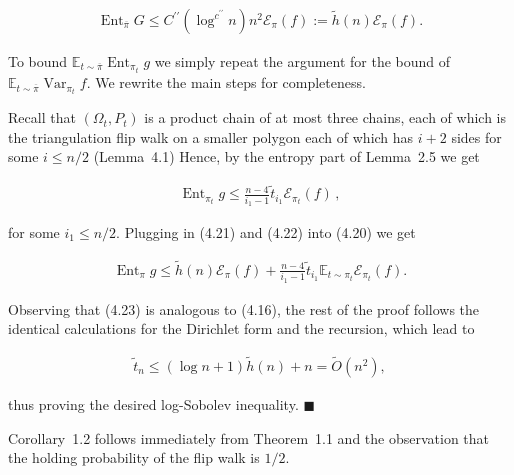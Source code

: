 \documentclass[10pt,a4paper]{article}
\begin{document}
\[\begin{gathered}
\operatorname{Ent}_{\overline{\pi}}G\leq C^{\prime\prime}(\log^{c^{\prime\prime}}n)n^{2}\mathcal{E}_{\pi}(f):=\tilde{h}(n)\mathcal{E}_{\pi}(f).
\end{gathered}\]


To bound $\mathbb{E}_{t\sim\overline{\pi}}\operatorname{Ent}_{\pi_{t}}g$ we simply repeat the argument for the bound of $\mathbb{E}_{t\sim\overline{\pi}}\operatorname{Var}_{\pi_{t}}f$. We rewrite the main steps for completeness.\par




Recall that $(\Omega_{t},P_{t})$ is a product chain of at most three chains, each of which is the triangulation flip walk on a smaller polygon each of which has $i+2$ sides for some $i\leq n/2$ (Lemma 4.1)
Hence, by the entropy part of Lemma 2.5 we get\par


\[\begin{gathered}
\operatorname{Ent}_{\pi_{t}}g\leq\frac{n-4}{i_{1}-1}\tilde{t}_{i_{1}}\mathcal{E}_{\pi_{t}}(f)\,,
\end{gathered}\]


for some $i_{1}\leq n/2$.
Plugging in (4.21) and (4.22) into (4.20) we get\par


\[\begin{gathered}
\operatorname{Ent}_{\pi}g\leq\tilde{h}(n)\mathcal{E}_{\pi}(f)+\frac{n-4}{i_{1}-1}\tilde{t}_{i_{1}}\mathbb{E}_{t\sim\pi_{t}}\mathcal{E}_{\pi_{t}}(f).
\end{gathered}\]


Observing that (4.23) is analogous to (4.16), the rest of the proof follows the identical calculations for the Dirichlet form and the recursion, which lead to\par


\[\begin{gathered}
\tilde{t}_{n}\leq(\log n+1)\tilde{h}(n)+n=\widetilde{O}(n^{2}),
\end{gathered}\]


thus proving the desired log-Sobolev inequality.
\ensuremath{\blacksquare}\par





Corollary 1.2 follows immediately from Theorem 1.1 and the observation that the holding probability of the flip walk is $1/2$.\par
\end{document}

